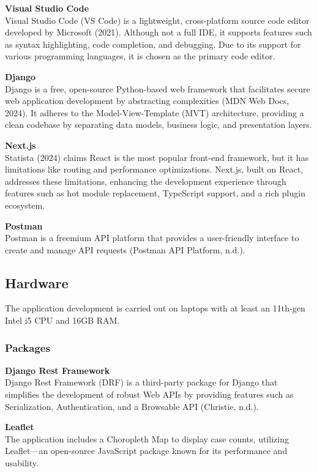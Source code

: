 \textbf{Visual Studio Code} \\
Visual Studio Code (VS Code) is a lightweight, cross-platform source code editor developed by Microsoft (2021). Although not a full IDE, it supports features such as syntax highlighting, code completion, and debugging. Due to its support for various programming languages, it is chosen as the primary code editor.

\textbf{Django} \\
Django is a free, open-source Python-based web framework that facilitates secure web application development by abstracting complexities (MDN Web Docs, 2024). It adheres to the Model-View-Template (MVT) architecture, providing a clean codebase by separating data models, business logic, and presentation layers.

\textbf{Next.js} \\
Statista (2024) claims React is the most popular front-end framework, but it has limitations like routing and performance optimizations. Next.js, built on React, addresses these limitations, enhancing the development experience through features such as hot module replacement, TypeScript support, and a rich plugin ecosystem.

\textbf{Postman} \\
Postman is a freemium API platform that provides a user-friendly interface to create and manage API requests (Postman API Platform, n.d.).

\subsection{Hardware}
The application development is carried out on laptops with at least an 11th-gen Intel i5 CPU and 16GB RAM.

\subsubsection{Packages}
\textbf{Django Rest Framework} \\
Django Rest Framework (DRF) is a third-party package for Django that simplifies the development of robust Web APIs by providing features such as Serialization, Authentication, and a Browsable API (Christie, n.d.).

\textbf{Leaflet} \\
The application includes a Choropleth Map to display case counts, utilizing Leaflet—an open-source JavaScript package known for its performance and usability.


